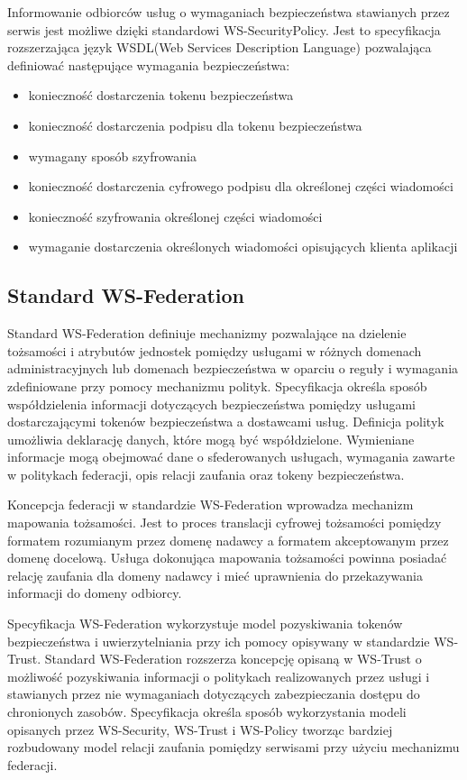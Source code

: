 	Informowanie odbiorców usług o wymaganiach bezpieczeństwa stawianych przez serwis jest możliwe dzięki standardowi WS-SecurityPolicy. Jest to specyfikacja rozszerzająca język WSDL(Web Services Description Language) pozwalająca definiować następujące wymagania bezpieczeństwa:

	\begin{itemize}
		\item konieczność dostarczenia tokenu bezpieczeństwa
		\item konieczność dostarczenia podpisu dla tokenu bezpieczeństwa
		\item wymagany sposób szyfrowania
		\item konieczność dostarczenia cyfrowego podpisu dla określonej części wiadomości
		\item konieczność szyfrowania określonej części wiadomości
		\item wymaganie dostarczenia określonych wiadomości opisujących klienta aplikacji
	\end{itemize} 

	\subsection{Standard WS-Federation}

		Standard WS-Federation definiuje mechanizmy pozwalające na dzielenie tożsamości i atrybutów jednostek pomiędzy usługami w różnych domenach administracyjnych lub domenach bezpieczeństwa w oparciu o reguły i wymagania zdefiniowane przy pomocy mechanizmu polityk\cite{Goodner09}. Specyfikacja określa sposób współdzielenia informacji dotyczących bezpieczeństwa pomiędzy usługami dostarczającymi tokenów bezpieczeństwa a dostawcami usług. Definicja polityk umożliwia deklarację danych, które mogą być współdzielone. Wymieniane informacje mogą obejmować dane o sfederowanych usługach, wymagania zawarte w politykach federacji, opis relacji zaufania oraz tokeny bezpieczeństwa.

		Koncepcja federacji w standardzie WS-Federation wprowadza mechanizm mapowania tożsamości. Jest to proces translacji cyfrowej tożsamości pomiędzy formatem rozumianym przez domenę nadawcy a formatem akceptowanym przez domenę docelową. Usługa dokonująca mapowania tożsamości powinna posiadać relację zaufania dla domeny nadawcy i mieć uprawnienia do przekazywania informacji do domeny odbiorcy.

		Specyfikacja WS-Federation wykorzystuje model pozyskiwania tokenów bezpieczeństwa i uwierzytelniania przy ich pomocy opisywany w standardzie WS-Trust. Standard WS-Federation rozszerza koncepcję opisaną w WS-Trust o możliwość pozyskiwania informacji o politykach realizowanych przez usługi i stawianych przez nie wymaganiach dotyczących zabezpieczania dostępu do chronionych zasobów. Specyfikacja określa sposób wykorzystania modeli opisanych przez WS-Security, WS-Trust i WS-Policy tworząc bardziej rozbudowany model relacji zaufania pomiędzy serwisami przy użyciu mechanizmu federacji.

